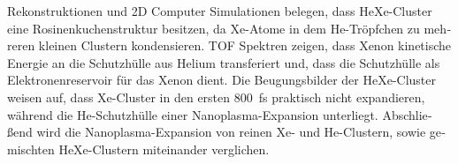 \begin{otherlanguage}{german}
Rekonstruktionen und 2D Computer Simulationen belegen, dass HeXe-Cluster eine Rosinenkuchenstruktur besitzen, da Xe-Atome in dem He-Tröpfchen zu mehreren kleinen Clustern kondensieren. TOF Spektren zeigen, dass Xenon kinetische Energie an die Schutzhülle aus Helium transferiert und, dass die Schutzhülle als Elektronenreservoir für das Xenon dient. Die Beugungsbilder der HeXe-Cluster weisen auf, dass Xe-Cluster in den ersten \SI{800}{\femto\second} praktisch nicht expandieren, während die He-Schutzhülle einer Nanoplasma-Expansion unterliegt. Abschließend wird die Nanoplasma-Expansion von reinen Xe- und He-Clustern, sowie gemischten HeXe-Clustern miteinander verglichen.
\end{otherlanguage}